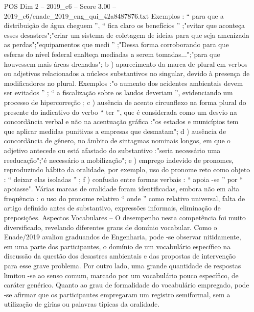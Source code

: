 \begin{textsample}{POS Dim 2 – 2019\_c6 – Score 3.00 – 2019\_c6/enade\_2019\_eng\_qui\_42a8487876.txt}
Exemplos : “ para que a distribuição de água cheguem ”, “ fica claro os benefícios ” ;"evitar que aconteça esses desastres";"criar um sistema de coletagem de ideias para que seja amenizada as perdas";"equipamentos que medi ” ;"Dessa forma corroborando para que esferas do nível federal enalteça mediadas a serem tomadas...";"para que houvessem mais áreas drenadas"; b ) aparecimento da marca de plural em verbos ou adjetivos relacionados a núcleos substantivos no singular, devido à presença de modificadores no plural.
Exemplos :"o aumento dos acidentes ambientais devem ser evitados ” ; “ a fiscalização sobre os laudos deveriam ”, evidenciando um processo de hipercorreção ; c ) ausência de acento circunflexo na forma plural do presente do indicativo do verbo “ ter ”, que é considerada como um desvio na concordância verbal e não na acentuação gráfica :"os estados e municípios tem que aplicar medidas punitivas a empresas que desmatam"; d ) ausência de concordância de gênero, no âmbito de sintagmas nominais longos, em que o adjetivo antecede ou está afastado do substantivo :"seria necessário uma reeducação";"é necessário a mobilização"; e ) emprego indevido de pronomes, reproduzindo hábito da oralidade, por exemplo, uso do pronome reto como objeto : “ deixar elas isoladas ” ; f ) confusão entre formas verbais : “ apoia -se ” por “ apoiasse".
Várias marcas de oralidade foram identificadas, embora não em alta frequência : o uso do pronome relativo “ onde ” como relativo universal, falta de artigo definido antes de substantivo, expressões informais, eliminação de preposições.
Aspectos Vocabulares – O desempenho nesta competência foi muito diversificado, revelando diferentes graus de domínio vocabular.
Como o Enade/2019 avaliou graduandos de Engenharia, pode -se observar nitidamente, em uma parte dos participantes, o domínio de um vocabulário específico na discussão da questão dos desastres ambientais e das propostas de intervenção para esse grave problema.
Por outro lado, uma grande quantidade de respostas limitou -se ao senso comum, marcado por um vocabulário pouco específico, de caráter genérico.
Quanto ao grau de formalidade do vocabulário empregado, pode -se afirmar que os participantes empregaram um registro semiformal, sem a utilização de gírias ou palavras típicas da oralidade.

\end{textsample}
